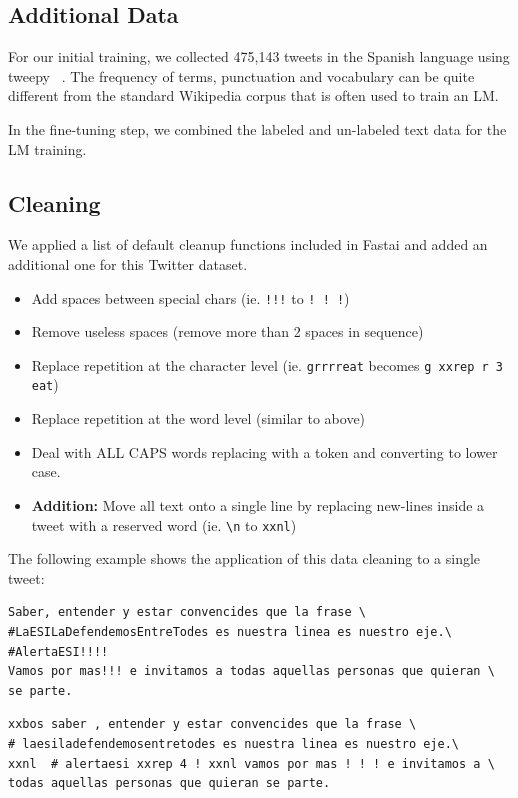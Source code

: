 \documentclass[smallextended]{svjour3}       %
\begin{document}
\subsection{Additional Data}
For our initial training, we  collected 475,143 tweets in the Spanish language using tweepy ~\cite{Tweepy}.  The frequency of terms, punctuation and vocabulary can be quite different from the standard Wikipedia corpus that is often used to train an LM.

In the fine-tuning step, we combined the labeled and un-labeled text data for the LM training.
\subsection{Cleaning}
We applied a list of default cleanup functions included in Fastai\cite{} and added an additional one for this Twitter dataset.
\begin{itemize}
	\item Add spaces between special chars (ie. \verb|!!!| to \verb|! ! !|)
	\item Remove useless spaces (remove more than 2 spaces in sequence)
	\item Replace repetition at the character level (ie. \verb|grrrreat| becomes \verb|g xxrep r 3 eat|)
	\item Replace repetition at the word level (similar to above)
	\item Deal with ALL CAPS words replacing with a token and converting to lower case.
	\item \textbf{Addition:} Move all text onto a single line by replacing new-lines inside a tweet with a reserved word (ie. \verb|\n| to \verb|xxnl|)
\end{itemize} 
The following example shows the application of this data cleaning to a single tweet:
\begin{verbatim} 
Saber, entender y estar convencides que la frase \
#LaESILaDefendemosEntreTodes es nuestra linea es nuestro eje.\
#AlertaESI!!!!
Vamos por mas!!! e invitamos a todas aquellas personas que quieran \
se parte.
\end{verbatim}

\begin{verbatim} 
xxbos saber , entender y estar convencides que la frase \
# laesiladefendemosentretodes es nuestra linea es nuestro eje.\
xxnl  # alertaesi xxrep 4 ! xxnl vamos por mas ! ! ! e invitamos a \
todas aquellas personas que quieran se parte.
\end{verbatim}
\end{document}
